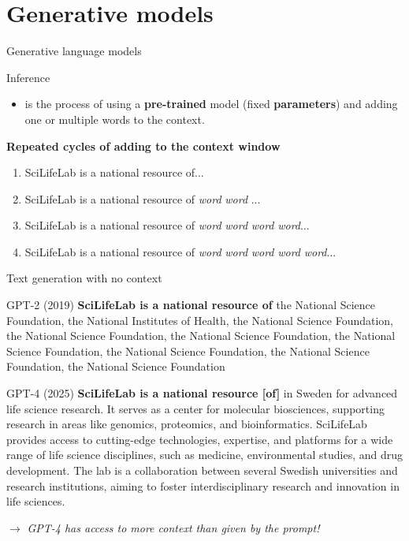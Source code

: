 \documentclass[10pt]{beamer}
\newcommand{\feature}[1]{{\color{scLime} \textbf{#1}}}
\newcommand{\remark}[1]{{\par \color{scGrape} \ensuremath{\rightarrow} \emph{#1}}}
\begin{document}

\section{Generative models}


\begin{frame}{Generative language models}
	\begin{exampleblock}{Inference}
		\begin{itemize}
			\item is the process of using a \feature{pre-trained} model (fixed \feature{parameters}) and adding one or multiple words to the context.
		\end{itemize}
	\end{exampleblock}
	\textbf{Repeated cycles of adding to the \feature{context window}}
	\begin{enumerate}
		\item SciLifeLab is a national resource of...
		\item SciLifeLab is a national resource of \emph{word} \emph{word} ...
		\item SciLifeLab is a national resource of \emph{word} \emph{word} \emph{word} \emph{word}...
		\item SciLifeLab is a national resource of \emph{word} \emph{word} \emph{word} \emph{word} \emph{word}...
	\end{enumerate}
\end{frame}


\begin{frame}{Text generation with no context}
		
	\begin{alertblock}{GPT-2 (2019) }
		\small
		\textbf{SciLifeLab is a national resource of} the National Science Foundation, the National Institutes of Health, the National Science Foundation, the National Science Foundation, the National Science Foundation, the National Science Foundation, the National Science Foundation, the National Science Foundation, the National Science Foundation
	\end{alertblock}
		
	\begin{alertblock}{GPT-4 (2025)}
		\small
		\textbf{SciLifeLab is a national resource [of]} in Sweden for advanced life science research. It serves as a center for molecular biosciences, supporting research in areas like genomics, proteomics, and bioinformatics. SciLifeLab provides access to cutting-edge technologies, expertise, and platforms for a wide range of life science disciplines, such as medicine, environmental studies, and drug development. The lab is a collaboration between several Swedish universities and research institutions, aiming to foster interdisciplinary research and innovation in life sciences.
	\end{alertblock}
	\remark{GPT-4 has access to more context than given by the prompt!}
\end{frame}
\end{document}
